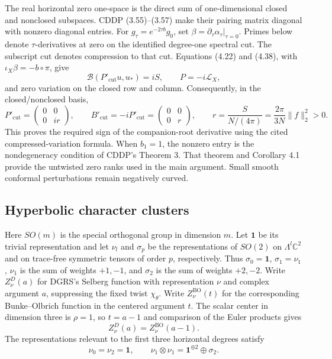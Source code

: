 \documentclass[11pt,letterpaper,reqno]{amsart}
\theoremstyle{remark}
\begin{document}
The real horizontal zero one-space is the direct sum of one-dimensional
closed and nonclosed subspaces. CDDP (3.55)--(3.57) make their pairing
matrix diagonal with nonzero diagonal entries. For
$g_\tau=e^{-2\tau b}g_0$, set
$\beta=\partial_\tau\alpha_\tau|_{\tau=0}$. Primes below denote
$\tau$-derivatives at zero on the identified degree-one spectral cut.
The subscript $\mathrm{cut}$ denotes compression to that cut.
Equations (4.22) and (4.38), with
$\iota_X\beta=-b\circ\pi$, give
\begin{equation}\label{app:Pvariationpairing}
 \mathcal B(P'_{\mathrm{cut}}u,u_*)=iS,
 \qquad P=-i\mathcal L_X,
\end{equation}
and zero variation on the closed row and column. Consequently, in
the closed/nonclosed basis,
\begin{equation}\label{app:positivevariation}
 P'_{\mathrm{cut}}=
 \begin{pmatrix}0&0\\0&ir\end{pmatrix},
 \qquad
 B'_{\mathrm{cut}}=-iP'_{\mathrm{cut}}=
 \begin{pmatrix}0&0\\0&r\end{pmatrix},
 \qquad
 r=\frac{S}{N/(4\pi)}
  =\frac{2\pi}{3N}\|f\|_2^2>0.
\end{equation}
This proves the required sign of the companion-root derivative using
the cited compressed-variation formula. When $b_1=1$, the nonzero
entry is the nondegeneracy condition of CDDP's Theorem 3. That theorem
and Corollary 4.1 provide the untwisted zero ranks used in the main
argument. Small smooth conformal perturbations remain negatively curved.

\subsection{Hyperbolic character clusters}\label{app:hyperbolic}

Here $SO(m)$ is the special orthogonal group in dimension $m$.
Let $\mathbf1$ be its trivial representation and let $\nu_l$ and
$\sigma_p$ be the representations of $SO(2)$ on
$\Lambda^l\mathbb C^2$ and on trace-free symmetric tensors of order
$p$, respectively. Thus $\sigma_0=\mathbf1$, $\sigma_1=\nu_1$,
$\nu_1$ is the sum of weights $+1,-1$, and $\sigma_2$ is the sum of
weights $+2,-2$.
Write $Z^D_\nu(a)$ for DGRS's Selberg function with representation
$\nu$ and complex argument $a$, suppressing the fixed twist
$\chi_\theta$. Write $Z^{\mathrm{BO}}_\nu(t)$ for the corresponding
Bunke--Olbrich function in the centered argument $t$. The scalar
center in dimension three is $\rho=1$, so $t=a-1$ and comparison of
the Euler products gives
\begin{equation}\label{app:centers}
 Z^D_\nu(a)=Z^{\mathrm{BO}}_\nu(a-1).
\end{equation}
The representations relevant to the first three horizontal degrees satisfy
\begin{equation}\label{app:weights}
 \nu_0=\nu_2=\mathbf1,
 \qquad
 \nu_1\otimes\nu_1=\mathbf1^{\oplus2}\oplus\sigma_2.
\end{equation}
\end{document}
